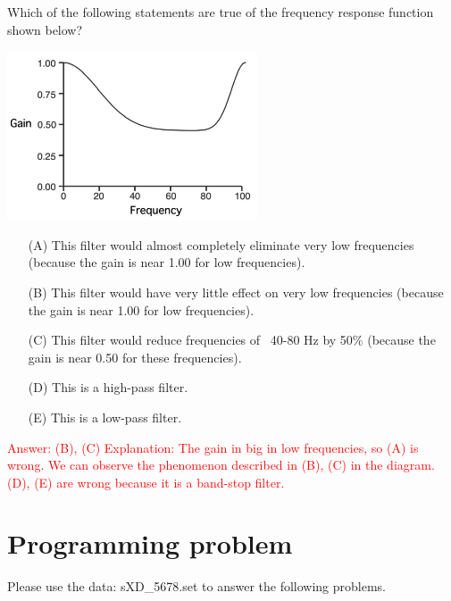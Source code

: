 \documentclass[a4 paper]{article}
\begin{document}
\begin{tcolorbox}[colback=RubineRed!5!white,colframe=RubineRed!75!black]
Which of the following statements are true of the frequency response function shown below? 
\begin{multicols*}{2}
\begin{center}
    \includegraphics[height=5cm]{figure/Frequency-Response.png}
\end{center}
\columnbreak
\begin{itemize}
    \item[(A)] This filter would almost completely eliminate very low frequencies (because the gain is near 1.00 for low frequencies).
    \item[(B)]This filter would have very little effect on very low frequencies (because the gain is near 1.00 for low frequencies).
    \item[(C)]This filter would reduce frequencies of ~40-80 Hz by 50\% (because the gain is near 0.50 for these frequencies).
    \item[(D)] This is a high-pass filter.
    \item[(E)] This is a low-pass filter. 
\end{itemize}
\end{multicols*}
\textcolor{red}{Answer: (B), (C)\newline 
Explanation: The gain in big in low frequencies, so (A) is wrong. We can observe the phenomenon described in (B), (C) in the diagram. (D), (E) are wrong because it is a band-stop filter.}
\end{tcolorbox}
\section{Programming problem}
Please use the data: sXD\_5678.set to answer the following problems.
\end{document}
